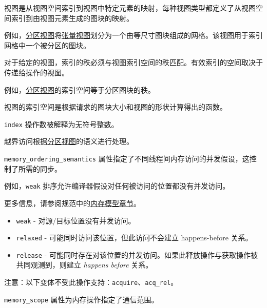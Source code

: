 \documentclass{article}
\begin{document}
视图是从视图空间索引到视图中特定元素的映射，每种视图类型都定义了从视图空间索引到由视图元素生成的图块的映射。



例如，\href{https://docs.nvidia.com/cuda/tile-ir/latest/sections/types.html#type-partition-view}{分区视图}将\href{https://docs.nvidia.com/cuda/tile-ir/latest/sections/types.html#type-tensor-view}{张量视图}划分为一个由等尺寸图块组成的网格。该视图用于索引网格中一个被分区的图块。



对于给定的视图，索引的秩必须与视图索引空间的秩匹配。有效索引的空间取决于传递给操作的视图。

例如，\href{https://docs.nvidia.com/cuda/tile-ir/latest/sections/types.html#type-partition-view}{分区视图}的索引空间等于分区图块的秩。



视图的索引空间是根据请求的图块大小和视图的形状计算得出的函数。



\texttt{index} 操作数被解释为无符号整数。



越界访问根据\href{https://docs.nvidia.com/cuda/tile-ir/latest/sections/types.html#type-partition-view}{分区视图}的语义进行处理。



\texttt{memory\_ordering\_semantics} 属性指定了不同线程间内存访问的并发假设，这控制了所需的同步。

例如，\texttt{weak} 排序允许编译器假设对任何被访问的位置都没有并发访问。

更多信息，请参阅规范中的\href{https://docs.nvidia.com/cuda/tile-ir/latest/sections/memory_model.html#section-memory-model}{内存模型章节}。



\begin{itemize}
\item \texttt{weak} - 对源/目标位置没有并发访问。
\item \texttt{relaxed} - 可能同时访问该位置，但此访问不会建立 happens-before 关系。
\item \texttt{release} - 可能同时存在对该位置的并发访问。如果此释放操作与获取操作被共同观测到，则建立 \textit{happens before} 关系。


\end{itemize}
注意：以下变体不受此操作支持：\texttt{acquire}、\texttt{acq\_rel}。



\texttt{memory\_scope} 属性为内存操作指定了通信范围。
\end{document}
